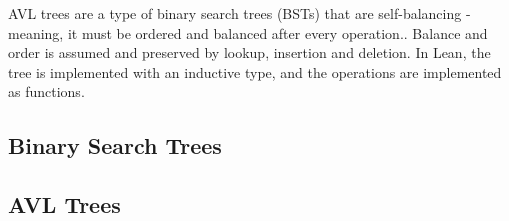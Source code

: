 AVL trees are a type of binary search trees (BSTs) that are self-balancing - meaning, it must be ordered and balanced after every operation.. Balance and order is assumed and preserved by lookup, insertion and deletion. In Lean, the tree is implemented with an inductive type, and the operations are implemented as functions.

\subsection{Binary Search Trees}


\subsection{AVL Trees}
